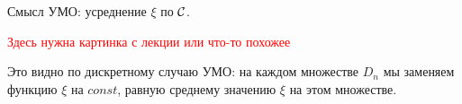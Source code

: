 \begin{note}
    Смысл УМО: усреднение $\xi$ по $\mathcal{C}$.

    \textcolor{red}{Здесь нужна картинка с лекции или что-то похожее}

    Это видно по дискретному случаю УМО: на каждом множестве $D_n$ мы заменяем функцию $\xi$ на $const$, равную среднему значению $\xi$ на этом множестве.
\end{note}